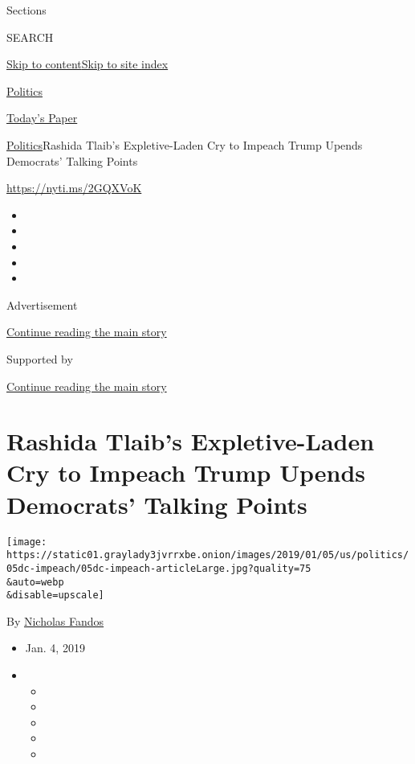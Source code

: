 Sections

SEARCH

\protect\hyperlink{site-content}{Skip to
content}\protect\hyperlink{site-index}{Skip to site index}

\href{https://www.nytimes3xbfgragh.onion/section/politics}{Politics}

\href{https://myaccount.nytimes3xbfgragh.onion/auth/login?response_type=cookie\&client_id=vi}{}

\href{https://www.nytimes3xbfgragh.onion/section/todayspaper}{Today's
Paper}

\href{/section/politics}{Politics}\textbar{}Rashida Tlaib's
Expletive-Laden Cry to Impeach Trump Upends Democrats' Talking Points

\url{https://nyti.ms/2GQXVoK}

\begin{itemize}
\item
\item
\item
\item
\item
\end{itemize}

Advertisement

\protect\hyperlink{after-top}{Continue reading the main story}

Supported by

\protect\hyperlink{after-sponsor}{Continue reading the main story}

\hypertarget{rashida-tlaibs-expletive-laden-cry-to-impeach-trump-upends-democrats-talking-points}{%
\section{Rashida Tlaib's Expletive-Laden Cry to Impeach Trump Upends
Democrats' Talking
Points}\label{rashida-tlaibs-expletive-laden-cry-to-impeach-trump-upends-democrats-talking-points}}

\texttt{[image: https://static01.graylady3jvrrxbe.onion/images/2019/01/05/us/politics/05dc-impeach/05dc-impeach-articleLarge.jpg?quality=75\\\&auto=webp\\\&disable=upscale]}

By \href{https://www.nytimes3xbfgragh.onion/by/nicholas-fandos}{Nicholas
Fandos}

\begin{itemize}
\item
  Jan. 4, 2019
\item
  \begin{itemize}
  \item
  \item
  \item
  \item
  \item
  \end{itemize}
\end{itemize}

